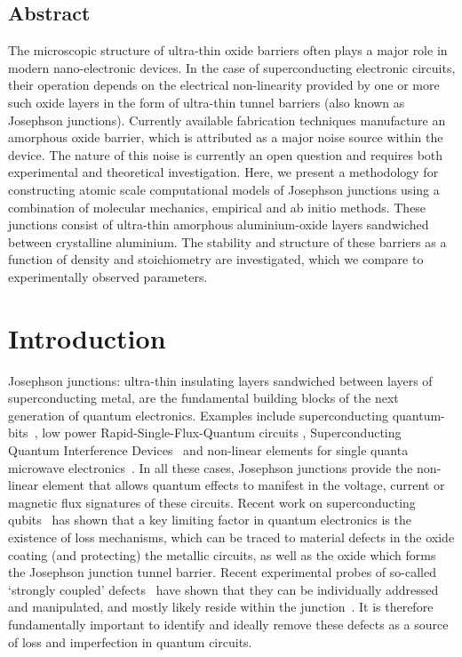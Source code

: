 \subsection{Abstract}
The microscopic structure of ultra-thin oxide barriers often plays a major role in modern nano-electronic devices.
In the case of superconducting electronic circuits, their operation depends on the electrical non-linearity provided by one or more such oxide layers in the form of ultra-thin tunnel barriers (also known as Josephson junctions).
Currently available fabrication techniques manufacture an amorphous oxide barrier, which is attributed as a major noise source within the device.
The nature of this noise is currently an open question and requires both experimental and theoretical investigation.
Here, we present a methodology for constructing atomic scale computational models of Josephson junctions using a combination of molecular mechanics, empirical and ab initio methods.
These junctions consist of ultra-thin amorphous aluminium-oxide layers sandwiched between crystalline aluminium. The stability and structure of these barriers as a function of density and stoichiometry are investigated, which we compare to experimentally observed parameters.


\section{Introduction}
Josephson junctions: ultra-thin insulating layers sandwiched between layers of superconducting metal, are the fundamental building blocks of the next generation of quantum electronics.
Examples include superconducting quantum-bits~\cite{Clarke1988,Martinis2002,Plourde2005,Deppe2007,Schreier2008}, low power Rapid-Single-Flux-Quantum circuits \cite{Mukhanov1987}, Superconducting Quantum Interference Devices~\cite{Weinstock1996} and non-linear elements for single quanta microwave electronics~\cite{Astafiev2007, Astafiev2010, Wilson2011, Hoi2013, Hoi2013a}.
In all these cases, Josephson junctions provide the non-linear element that allows quantum effects to manifest in the voltage, current or magnetic flux signatures of these circuits.
Recent work on superconducting qubits~\cite{Dutta1981, Shnirman2005} has shown that a key limiting factor in quantum electronics is the existence of loss mechanisms, which can be traced to material defects in the oxide coating (and protecting) the metallic circuits, as well as the oxide which forms the Josephson junction tunnel barrier.
Recent experimental probes of so-called `strongly coupled' defects~\cite{Neeley2008, Lupascu2009, Lisenfeld2010} have shown that they can be individually addressed and manipulated, and mostly likely reside within the junction~\cite{Lacquaniti2012}.
It is therefore fundamentally important to identify and ideally remove these defects as a source of loss and imperfection in quantum circuits.


